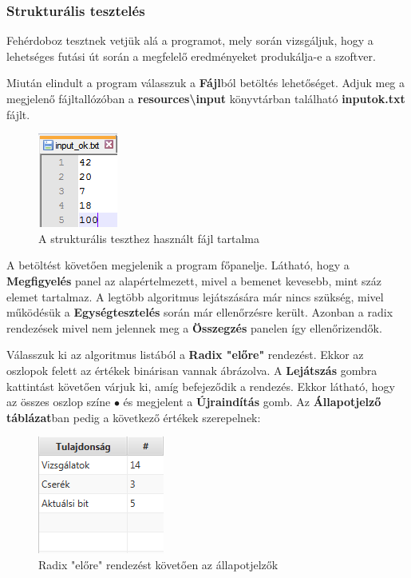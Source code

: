 \documentclass{elteikthesis}
\begin{document}
\subsubsection{Strukturális tesztelés}
Fehérdoboz tesztnek vetjük alá a programot, mely során vizsgáljuk, hogy a lehetséges futási út során a megfelelő eredményeket produkálja-e a szoftver.\par
Miután elindult a program válasszuk a \textbf{Fájl}ból betöltés lehetőséget. Adjuk meg a megjelenő fájltallózóban a \textbf{resources\textbackslash input} könyvtárban található \textbf{input\textunderscore ok.txt} fájlt.
\begin{figure}[H]
	\centering
	\includegraphics{pics/test/file_content.png}
	\caption{A strukturális teszthez használt fájl tartalma}
\end{figure}
A betöltést követően megjelenik a program főpanelje. Látható, hogy a \textbf{Megfigyelés} panel az alapértelmezett, mivel a bemenet kevesebb, mint száz elemet tartalmaz. A legtöbb algoritmus lejátszására már nincs szükség, mivel működésük a \textbf{Egységtesztelés} során már ellenőrzésre került. Azonban a radix rendezések mivel nem jelennek meg a \textbf{Összegzés} panelen így ellenőrizendők.\par
Válasszuk ki az algoritmus listából a \textbf{Radix "előre"} rendezést. Ekkor az oszlopok felett az értékek binárisan vannak ábrázolva. A \textbf{Lejátszás} gombra kattintást követően várjuk ki, amíg befejeződik a rendezés. Ekkor látható, hogy az összes oszlop színe \textcolor{done}{\Huge$\bullet$} és megjelent a \textbf{Újraindítás} gomb. Az \textbf{Állapotjelző táblázat}ban pedig a következő értékek szerepelnek:
\begin{figure}[H]
	\centering
	\includegraphics{pics/test/radixforwardcounters.png}
	\caption{Radix "előre" rendezést követően az állapotjelzők}
\end{figure}
\end{document}
